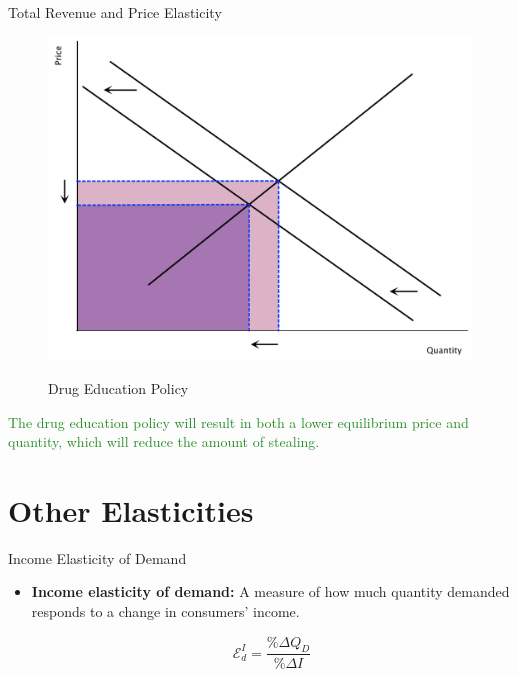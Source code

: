 \documentclass[xcolor={dvipsnames},pdf, hyperref={colorlinks=true, citecolor=ForestGreen, linkcolor=BlueViolet, urlcolor=Magenta}]{beamer}
\newcommand{\defn}[1]{\textbf{#1}}
\newcommand{\ddp}[1]{{\textcolor{ForestGreen}{#1}}}
\begin{document}
\begin{frame}[b]{Total Revenue and Price Elasticity}
	
	
	\begin{figure}[H]
		\centering
		\ddp{\includegraphics[scale=.25]{plot33.pdf}}
		\caption{Drug Education Policy}
	\end{figure}
	
	\ddp{The drug education policy will result in both a lower equilibrium price and quantity, which will reduce the amount of stealing.}
\end{frame}

\section{Other Elasticities}

\begin{frame}{Income Elasticity of Demand}
	\begin{itemize}
		\item \defn{Income elasticity of demand:} A measure of how much quantity demanded responds to a change in consumers' income.
		
		\[\mathcal{E}_d^I =\frac{\% \Delta Q_D}{\% \Delta I}\]

		
	\end{itemize}
\end{frame}
\end{document}
